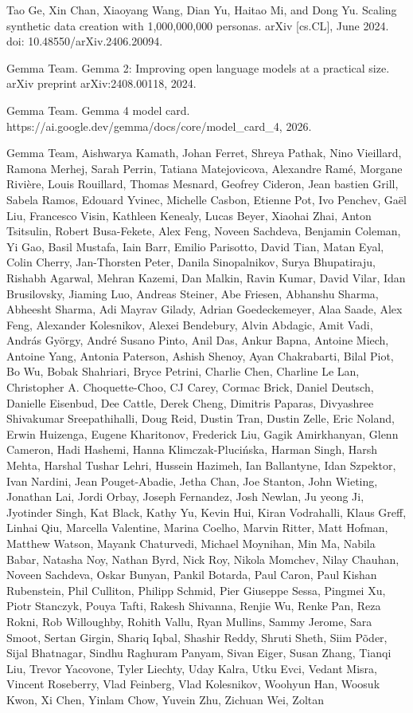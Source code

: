 Tao Ge, Xin Chan, Xiaoyang Wang, Dian Yu, Haitao Mi, and Dong Yu.
Scaling synthetic data creation with 1,000,000,000 personas. arXiv
{[}cs.CL{]}, June 2024. doi: 10.48550/arXiv.2406.20094.

Gemma Team. Gemma 2: Improving open language models at a practical size.
arXiv preprint arXiv:2408.00118, 2024.

Gemma Team. Gemma 4 model card.
https://ai.google.dev/gemma/docs/core/model\_card\_4, 2026.

Gemma Team, Aishwarya Kamath, Johan Ferret, Shreya Pathak, Nino
Vieillard, Ramona Merhej, Sarah Perrin, Tatiana Matejovicova, Alexandre
Ramé, Morgane Rivière, Louis Rouillard, Thomas Mesnard, Geofrey Cideron,
Jean bastien Grill, Sabela Ramos, Edouard Yvinec, Michelle Casbon,
Etienne Pot, Ivo Penchev, Gaël Liu, Francesco Visin, Kathleen Kenealy,
Lucas Beyer, Xiaohai Zhai, Anton Tsitsulin, Robert Busa-Fekete, Alex
Feng, Noveen Sachdeva, Benjamin Coleman, Yi Gao, Basil Mustafa, Iain
Barr, Emilio Parisotto, David Tian, Matan Eyal, Colin Cherry,
Jan-Thorsten Peter, Danila Sinopalnikov, Surya Bhupatiraju, Rishabh
Agarwal, Mehran Kazemi, Dan Malkin, Ravin Kumar, David Vilar, Idan
Brusilovsky, Jiaming Luo, Andreas Steiner, Abe Friesen, Abhanshu Sharma,
Abheesht Sharma, Adi Mayrav Gilady, Adrian Goedeckemeyer, Alaa Saade,
Alex Feng, Alexander Kolesnikov, Alexei Bendebury, Alvin Abdagic, Amit
Vadi, András György, André Susano Pinto, Anil Das, Ankur Bapna, Antoine
Miech, Antoine Yang, Antonia Paterson, Ashish Shenoy, Ayan Chakrabarti,
Bilal Piot, Bo Wu, Bobak Shahriari, Bryce Petrini, Charlie Chen,
Charline Le Lan, Christopher A. Choquette-Choo, CJ Carey, Cormac Brick,
Daniel Deutsch, Danielle Eisenbud, Dee Cattle, Derek Cheng, Dimitris
Paparas, Divyashree Shivakumar Sreepathihalli, Doug Reid, Dustin Tran,
Dustin Zelle, Eric Noland, Erwin Huizenga, Eugene Kharitonov, Frederick
Liu, Gagik Amirkhanyan, Glenn Cameron, Hadi Hashemi, Hanna
Klimczak-Plucińska, Harman Singh, Harsh Mehta, Harshal Tushar Lehri,
Hussein Hazimeh, Ian Ballantyne, Idan Szpektor, Ivan Nardini, Jean
Pouget-Abadie, Jetha Chan, Joe Stanton, John Wieting, Jonathan Lai,
Jordi Orbay, Joseph Fernandez, Josh Newlan, Ju yeong Ji, Jyotinder
Singh, Kat Black, Kathy Yu, Kevin Hui, Kiran Vodrahalli, Klaus Greff,
Linhai Qiu, Marcella Valentine, Marina Coelho, Marvin Ritter, Matt
Hofman, Matthew Watson, Mayank Chaturvedi, Michael Moynihan, Min Ma,
Nabila Babar, Natasha Noy, Nathan Byrd, Nick Roy, Nikola Momchev, Nilay
Chauhan, Noveen Sachdeva, Oskar Bunyan, Pankil Botarda, Paul Caron, Paul
Kishan Rubenstein, Phil Culliton, Philipp Schmid, Pier Giuseppe Sessa,
Pingmei Xu, Piotr Stanczyk, Pouya Tafti, Rakesh Shivanna, Renjie Wu,
Renke Pan, Reza Rokni, Rob Willoughby, Rohith Vallu, Ryan Mullins, Sammy
Jerome, Sara Smoot, Sertan Girgin, Shariq Iqbal, Shashir Reddy, Shruti
Sheth, Siim Põder, Sijal Bhatnagar, Sindhu Raghuram Panyam, Sivan Eiger,
Susan Zhang, Tianqi Liu, Trevor Yacovone, Tyler Liechty, Uday Kalra,
Utku Evci, Vedant Misra, Vincent Roseberry, Vlad Feinberg, Vlad
Kolesnikov, Woohyun Han, Woosuk Kwon, Xi Chen, Yinlam Chow, Yuvein Zhu,
Zichuan Wei, Zoltan



